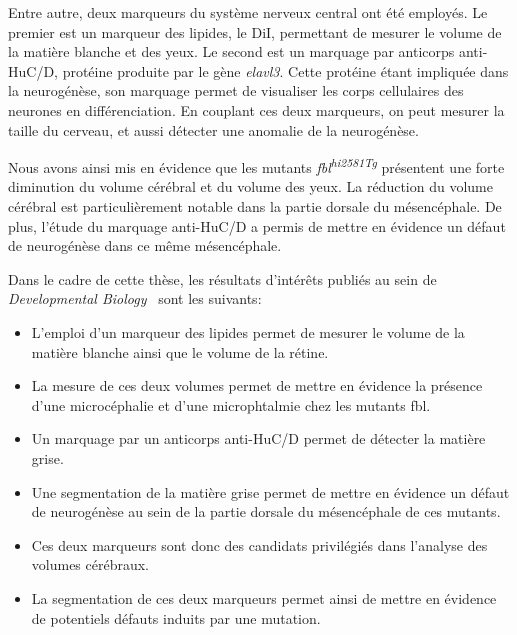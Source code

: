 \documentclass[\main/main.tex]{subfiles}
\begin{document}
%
Entre autre, deux marqueurs du système nerveux central ont été employés.
%
Le premier est un marqueur des lipides, le DiI, permettant de mesurer le volume de la matière blanche et des yeux.
%
Le second est un marquage par anticorps anti-HuC/D, protéine produite par le gène \textit{elavl3}.
%
Cette protéine étant impliquée dans la neurogénèse, son marquage permet de visualiser les corps cellulaires des neurones en différenciation.
%
En couplant ces deux marqueurs, on peut mesurer la taille du cerveau, et aussi détecter une anomalie de la neurogénèse.

%
Nous avons ainsi mis en évidence que les mutants \textit{fbl\textsuperscript{hi2581Tg}}
présentent une forte diminution du volume cérébral et du volume des yeux.
%
La réduction du volume cérébral est particulièrement notable
dans la partie dorsale du mésencéphale.
%
De plus, l'étude du marquage anti-HuC/D a permis de mettre en évidence
un défaut de neurogénèse dans ce même mésencéphale.

%
Dans le cadre de cette thèse, les résultats d'intérêts publiés au sein de
\emph{Developmental Biology}~\cite{bouffard_2018} sont les suivants:

\begin{itemize}
    
    \item
    L'emploi d'un marqueur des lipides permet de mesurer le volume de la matière blanche
    ainsi que le volume de la rétine.
    
    \item
    La mesure de ces deux volumes permet de mettre en évidence la présence d'une microcéphalie
    et d'une microphtalmie chez les mutants fbl.
    
    \item
    Un marquage par un anticorps anti-HuC/D permet de détecter la matière grise.
    
    \item
    Une segmentation de la matière grise permet de mettre en évidence
    un défaut de neurogénèse au sein de la partie dorsale du mésencéphale de ces mutants.
    
    \item
    Ces deux marqueurs sont donc des candidats privilégiés
    dans l'analyse des volumes cérébraux.
    
    \item
    La segmentation de ces deux marqueurs permet ainsi de mettre en évidence
    de potentiels défauts induits par une mutation.
    
\end{itemize}
\end{document}
